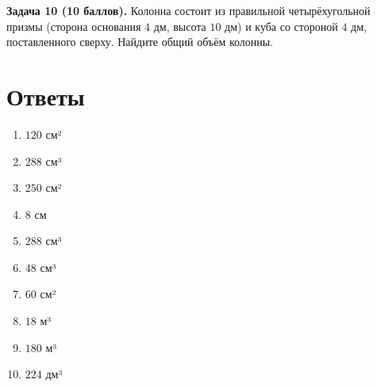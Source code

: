 \documentclass{umk-matematika}
\begin{document}
\textbf{Задача 10 (10 баллов).} Колонна состоит из правильной четырёхугольной призмы (сторона основания $4$ дм, высота $10$ дм) и куба со стороной $4$ дм, поставленного сверху. Найдите общий объём колонны.

\newpage
\section*{Ответы}

\begin{enumerate}
  \item $120$ см²
  \item $288$ см³
  \item $250$ см²
  \item $8$ см
  \item $288$ см³
  \item $48$ см³
  \item $60$ см²
  \item $18$ м³
  \item $180$ м³
  \item $224$ дм³
\end{enumerate}
\end{document}

